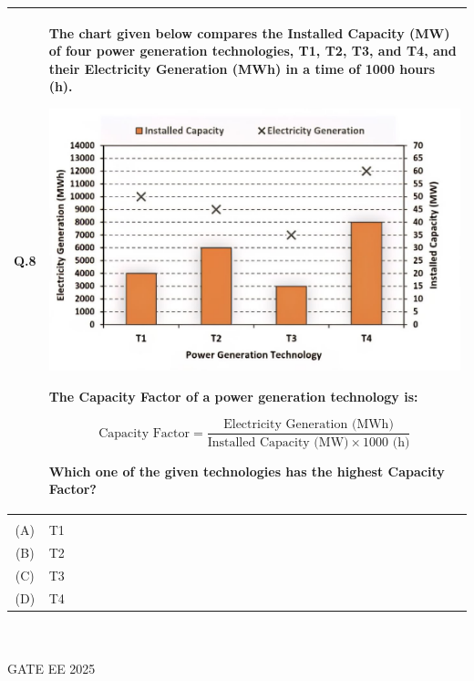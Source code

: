 \documentclass[journal,12pt,onecolumn]{IEEEtran}
\theoremstyle{remark}
\begin{document}
\begin{tabular}{|c|p{16cm}|}\hline
   Q.8 & The chart given below compares the Installed Capacity (MW) of four power generation technologies, T1, T2, T3, and T4, and their Electricity Generation (MWh) in a time of 1000 hours (h).

\medskip

\includegraphics[scale=0.25]{charts.jpg}

\medskip

\textbf{The Capacity Factor of a power generation technology is:}

\[
\text{Capacity Factor} = \frac{\text{Electricity Generation (MWh)}}{\text{Installed Capacity (MW)} \times 1000 \text{ (h)}}
\]

\medskip

Which one of the given technologies has the highest Capacity Factor? \\   \hline
     & \\    \hline
  (A) & T1\\   \hline
  (B) & T2\\  \hline
  (C) & T3\\  \hline
  (D) & T4\\  \hline
\end{tabular} ~\\ \\
GATE EE 2025\\
\end{document}
